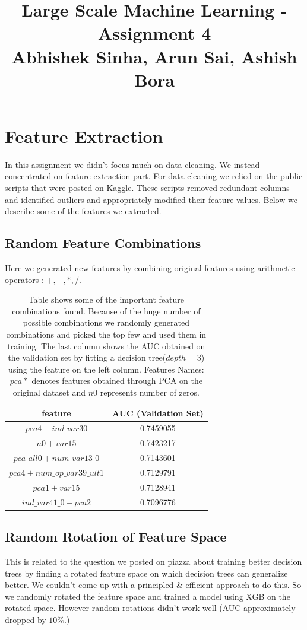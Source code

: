\documentclass{article}
\begin{document}
\title{Large Scale Machine Learning - Assignment 4\\Abhishek Sinha, Arun Sai, Ashish Bora}
\maketitle
\section{Feature Extraction}
In this assignment we didn't focus much on data cleaning. We instead concentrated on feature extraction part. For data cleaning we relied on the public scripts that were posted on Kaggle. These scripts removed redundant columns and identified outliers and appropriately modified their feature values.
Below we describe some of the features we extracted. 
\subsection{Random Feature Combinations}
Here we generated new features by combining original features using arithmetic operators : $+, -, * , /$.
\begin{table}[h!]
\begin{center}
\begin{tabular}{ |c|c| } 
\hline
feature&AUC (Validation Set)\\ \hline
$pca4-ind\_var30$&0.7459055\\ \hline
$n0+var15$&0.7423217\\ \hline
$pca\_all0+num\_var13\_0$&0.7143601\\ \hline
$pca4+num\_op\_var39\_ult1$&0.7129791\\ \hline
$pca1+var15$&0.7128941\\ \hline
$ind\_var41\_0-pca2$&0.7096776\\ \hline
\end{tabular}
\end{center}
\caption{Table shows some of the important feature combinations found. Because of the huge number of possible combinations we randomly generated combinations and picked the top few and used them in training. The last column shows the AUC obtained on the validation set by fitting a decision tree($depth=3$) using the feature on the left column. Features Names: $pca*$ denotes features obtained through PCA on the original dataset and $n0$  represents number of zeros.}
\end{table}
\subsection{Random Rotation of Feature Space}
This is related to the question we posted on piazza about training better decision trees by finding a rotated feature space on which decision trees can generalize better. We couldn't come up with a principled \& efficient approach to do this. So we randomly rotated the feature space and trained a model using XGB on the rotated space. However random rotations didn't work well (AUC approximately dropped by $10\%$.)
\end{document}
